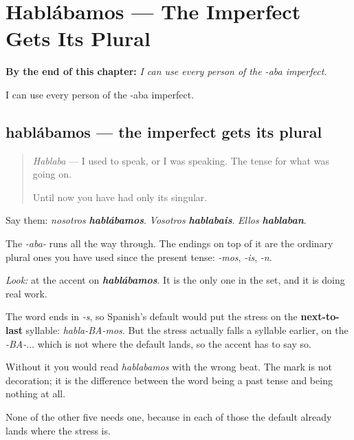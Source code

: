 
\chapter{Hablábamos --- The Imperfect Gets Its Plural}
\label{ch:hablabamos}

\begin{chapteropening}
\textbf{By the end of this chapter:} \emph{I can use every person of the -aba imperfect.}

I can use every person of the -aba imperfect.
\end{chapteropening}

\section[hablábamos]{hablábamos — the imperfect gets its plural}

\label{lesson:ES-C63-hablabamos}



\begin{quote}
\emph{Hablaba} — I used to speak, or I was speaking. The tense for what was going on.

Until now you have had only its singular.
\end{quote}

\begin{grammarlens}[title={Grammar Lens: the three that were missing}]
Say them: \emph{nosotros} \emph{\textbf{hablábamos}}. \emph{Vosotros} \emph{\textbf{hablabais}}. \emph{Ellos} \emph{\textbf{hablaban}}.

The \emph{-aba-} runs all the way through. The endings on top of it are the ordinary plural ones you have used since the present tense: \emph{-mos}, \emph{-is}, \emph{-n}.
\end{grammarlens}

\begin{culture}
\emph{Look:} at the accent on \emph{\textbf{hablábamos}}. It is the only one in the set, and it is doing real work.

The word ends in \emph{-s}, so Spanish's default would put the stress on the \textbf{next-to-last} syllable: \emph{habla-BA-mos}. But the stress actually falls a syllable earlier, on the \emph{-BA-}... which is not where the default lands, so the accent has to say so.

Without it you would read \emph{hablabamos} with the wrong beat. The mark is not decoration; it is the difference between the word being a past tense and being nothing at all.

None of the other five needs one, because in each of those the default already lands where the stress is.
\end{culture}

